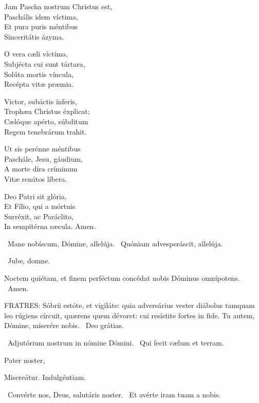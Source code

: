 Jam Pascha nostrum Christus est,\\
Paschális idem víctima,\\
Et pura puris méntibus\\
Sinceritátis ázyma.

O vera cæli víctima,\\
Subjécta cui sunt tártara,\\
Solúta mortis víncula,\\
Recépta vitæ præmia.

Victor, subáctis ínferis,\\
Trophæa Christus éxplicat;\\
Cælóque apérto, súbditum\\
Regem tenebrárum trahit.

Ut sis perénne méntibus\\
Paschále, Jesu, gáudium,\\
A morte dira críminum\\
Vitæ renátos líbera.

Deo Patri sit glória,\\
Et Fílio, qui a mórtuis\\
Surréxit, ac Paráclito,\\
In sempitérna sæcula. Amen.

\V\ Mane nobíscum, Dómine, allelúja. \R\ Quóniam advesperáscit, allelúja.



\sectionornament


\V\ Jube, domne.

 Noctem quiétam, et finem perféctum concédat nobis Dóminus omnípotens. \R\ Amen.


\lettrine[lines=2]{F}{RATRES}: Sóbrii estóte, et vigiláte: quia adversárius vester diábolus tamquam leo rúgiens círcuit, quærens quem dévoret: cui resístite fortes in fide. Tu autem, Dómine, miserére nobis. \R\ Deo grátias.

\V\ Adjutórium nostrum in nómine Dómini. \R\ Qui fecit cælum et terram.

Pater noster, 

 Misereátur. Indulgéntiam.

\V\ Convérte nos, Deus, salutáris noster. \R\ Et avérte iram tuam a nobis.

